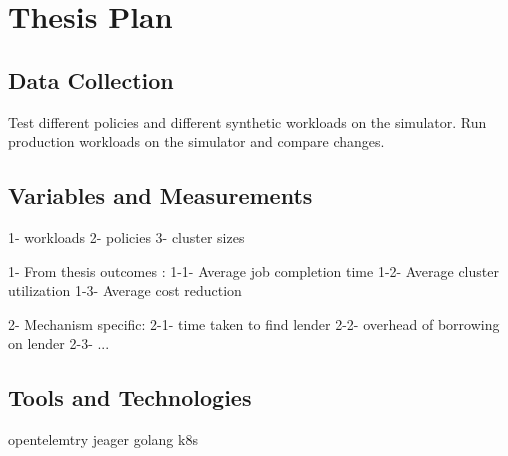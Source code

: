 \section{Thesis Plan}


\subsection{Data Collection}
Test different policies and different synthetic workloads on the simulator. 
Run production workloads on the simulator and compare changes.

\subsection{Variables and Measurements}
1- workloads %
2- policies 
3- cluster sizes

1- From thesis outcomes :
    1-1- Average job completion time
    1-2- Average cluster utilization
    1-3- Average cost reduction

2- Mechanism specific: 
   2-1- time taken to find lender
   2-2- overhead of borrowing on lender
   2-3- ... 

\subsection{Tools and Technologies}
opentelemtry
jeager
golang
k8s

